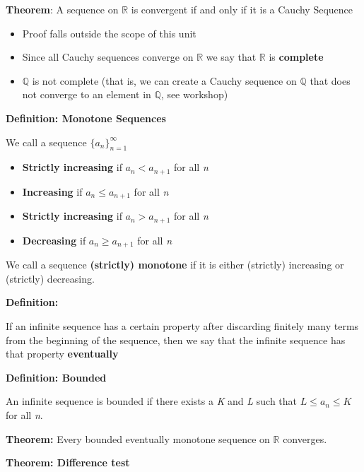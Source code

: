 \documentclass{article}
\newcommand*{\Q}{\mathbb{Q}}
\newcommand*{\R}{\mathbb{R}}
\begin{document}
\vspace{\baselineskip}
\textbf{Theorem}: A sequence on \(\R\) is convergent if and only if it is a Cauchy Sequence
\begin{itemize}
    \item Proof falls outside the scope of this unit
    \item Since all Cauchy sequences converge on \(\R\) we say that \(\R\) is \textbf{complete}
    \item \(\Q\) is not complete (that is, we can create a Cauchy sequence on \(\Q\) that does not converge to an element in \(\Q\), see workshop)
\end{itemize}
    
\vspace{\baselineskip}
\textbf{Definition: Monotone Sequences}

We call a sequence \(\{a_n\}^{\infty}_{n=1}\)
\begin{itemize}
    \item \textbf{Strictly increasing} if \(a_n < a_{n+1}\) for all \textit{n}
    \item \textbf{Increasing} if \(a_n \leq a_{n+1}\) for all \textit{n}
    \item \textbf{Strictly increasing} if \(a_n > a_{n+1}\) for all \textit{n}
    \item \textbf{Decreasing} if \(a_n \geq a_{n+1}\) for all \textit{n}
\end{itemize}

We call a sequence \textbf{(strictly) monotone} if it is either (strictly) increasing or (strictly) decreasing.

\vspace{\baselineskip}
\textbf{Definition:}

If an infinite sequence has a certain property after discarding finitely many terms from the beginning of the sequence, then we say that the infinite sequence has that property \textbf{eventually}

\vspace{\baselineskip}
\textbf{Definition: Bounded}

An infinite sequence is bounded if there exists a \textit{K} and \textit{L} such that \(L \leq a_n \leq K\) for all \textit{n}.

\textbf{Theorem:} Every bounded eventually monotone sequence on \(\R\) converges.

\vspace{\baselineskip}
\textbf{Theorem: Difference test}
\end{document}
